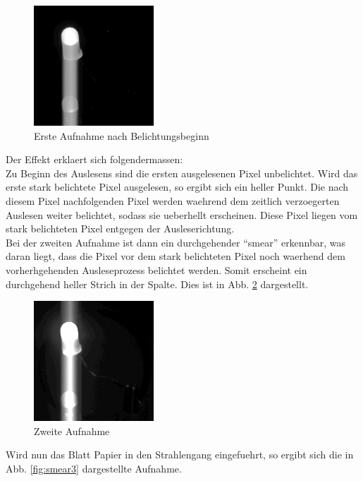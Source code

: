 \begin{figure}[h!]
\centering
        \includegraphics[width=.4\textwidth]{smear_unten_sebi.png}
\caption{ Erste Aufnahme nach Belichtungsbeginn }
\label{fig:smear1}
\end{figure}
Der Effekt erklaert sich folgendermassen:\\
Zu Beginn des Auslesens sind die ersten ausgelesenen Pixel unbelichtet. Wird das erste stark belichtete Pixel ausgelesen, so ergibt sich ein heller Punkt. Die nach diesem Pixel nachfolgenden Pixel werden waehrend dem zeitlich verzoegerten Auslesen weiter belichtet, sodass sie ueberhellt erscheinen. Diese Pixel liegen vom stark belichteten Pixel entgegen der Ausleserichtung. \\
Bei der zweiten Aufnahme ist dann ein durchgehender \enquote{smear} erkennbar, was daran liegt, dass die Pixel vor dem stark belichteten Pixel noch waerhend dem vorherhgehenden Ausleseprozess belichtet werden. Somit erscheint ein durchgehend heller Strich in der Spalte. Dies ist in Abb. \ref{fig:smear2} dargestellt. 

\begin{figure}[h!]
\centering
        \includegraphics[width=.4\textwidth]{smear.png}
\caption{ Zweite Aufnahme }
\label{fig:smear2}
\end{figure}

Wird nun das Blatt Papier in den Strahlengang eingefuehrt, so ergibt sich die in Abb. \ref{fig:smear3} dargestellte Aufnahme. 

